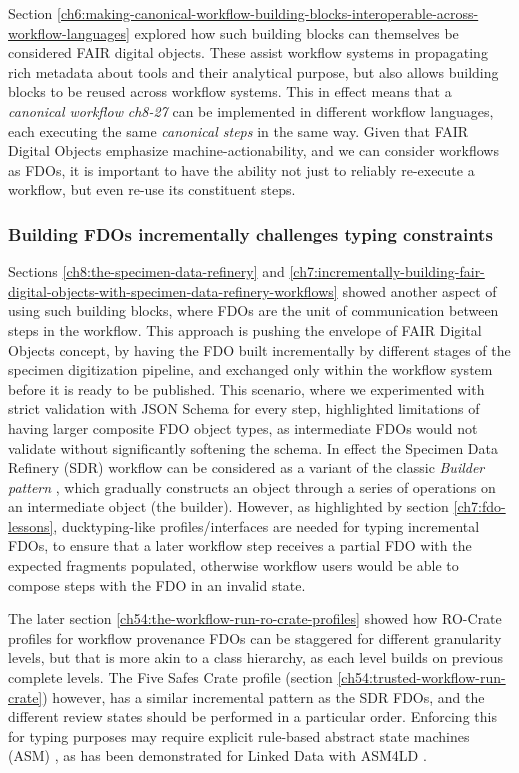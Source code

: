 Section \vref{ch6:making-canonical-workflow-building-blocks-interoperable-across-workflow-languages} explored how such building blocks can themselves be considered FAIR digital objects. These assist workflow systems in propagating rich metadata about tools and their analytical purpose, but also allows building blocks to be reused across workflow systems. This in effect means that a \emph{canonical workflow} \emph{ch8-27} can be implemented in different workflow languages, each executing the same \emph{canonical steps} in the same way. Given that FAIR Digital Objects emphasize machine-actionability, and we can consider workflows as FDOs, it is important to have the ability not just to reliably re-execute a workflow, but even re-use its constituent steps. 


\subsubsection{Building FDOs incrementally challenges typing constraints}
\label{ch61:buildingfdo}

Sections \vref{ch8:the-specimen-data-refinery} and \vref{ch7:incrementally-building-fair-digital-objects-with-specimen-data-refinery-workflows} showed another aspect of using such building blocks, where FDOs are the unit of communication between steps in the workflow. 
This approach is pushing the envelope of FAIR Digital Objects concept, by having the FDO built incrementally by different stages of the specimen digitization pipeline, and exchanged only within the workflow system before it is ready to be published. 
This scenario, where we experimented with strict validation with JSON Schema for every step, highlighted limitations of having larger composite FDO object types, as intermediate FDOs would not validate without significantly softening the schema.
In effect the Specimen Data Refinery (SDR) workflow can be considered as a variant of the classic \emph{Builder pattern} \cite[pp. 97--106]{Gamma 1995}, which gradually constructs an object through a series of operations on an intermediate object (the builder).
However, as highlighted by section \vref{ch7:fdo-lessons}, ducktyping-like profiles/interfaces are needed for typing incremental FDOs, to ensure that a later workflow step receives a partial FDO with the expected fragments populated, otherwise workflow users would be able to compose steps with the FDO in an invalid state. 

The later section \vref{ch54:the-workflow-run-ro-crate-profiles} showed how RO-Crate profiles for workflow provenance FDOs can be staggered for different granularity levels, but that is more akin to a class hierarchy, as each level builds on previous complete levels.  The Five Safes Crate profile (section \vref{ch54:trusted-workflow-run-crate}) however, has a similar incremental pattern as the SDR FDOs, and the different review states should be performed in a particular order. Enforcing this for typing purposes may require explicit rule-based abstract state machines (ASM) \cite{Gurevich 1995}, as has been demonstrated for Linked Data with ASM4LD \cite{Käfer 2018a,Käfer 2018b}.


